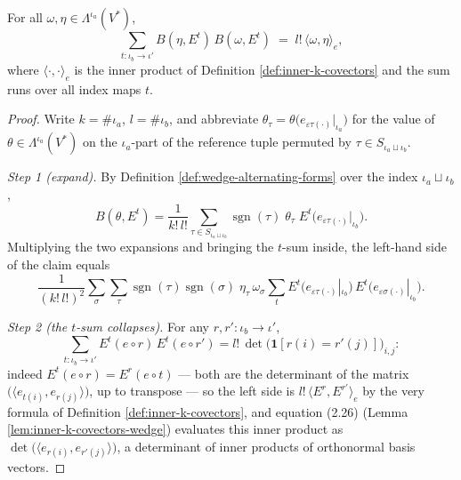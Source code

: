 \begin{lemma}
\label{lem:hodge-scalar-identity}
\leanok
{}
For all $\omega, \eta \in \Lambda^{\iota_a}(V^*)$,
\[
\sum_{t \colon \iota_b \to \iota'} B(\eta, E^t)\, B(\omega, E^t) \;=\; l!\, \langle \omega, \eta \rangle_e,
\]
where $\langle \cdot, \cdot \rangle_e$ is the inner product of Definition \ref{def:inner-k-covectors} and the sum runs over all index maps $t$.
\end{lemma}
\begin{proof}
\leanok
Write $k = \#\iota_a$, $l = \#\iota_b$, and abbreviate $\theta_\tau = \theta\big(e_{\varepsilon\tau(\cdot)}|_{\iota_a}\big)$ for the value of $\theta \in \Lambda^{\iota_a}(V^*)$ on the $\iota_a$-part of the reference tuple permuted by $\tau \in S_{\iota_a \sqcup \iota_b}$.

\emph{Step 1 (expand).} By Definition \ref{def:wedge-alternating-forms} over the index $\iota_a \sqcup \iota_b$,
\[
B(\theta, E^t) = \frac{1}{k!\,l!} \sum_{\tau \in S_{\iota_a \sqcup \iota_b}} \operatorname{sgn}(\tau)\; \theta_\tau \; E^t\big(e_{\varepsilon\tau(\cdot)}|_{\iota_b}\big).
\]
Multiplying the two expansions and bringing the $t$-sum inside, the left-hand side of the claim equals
\[
\frac{1}{(k!\,l!)^2} \sum_{\sigma} \sum_{\tau} \operatorname{sgn}(\tau)\operatorname{sgn}(\sigma)\; \eta_\tau\, \omega_\sigma \sum_{t} E^t\big(e_{\varepsilon\tau(\cdot)}|_{\iota_b}\big)\, E^t\big(e_{\varepsilon\sigma(\cdot)}|_{\iota_b}\big).
\]

\emph{Step 2 (the $t$-sum collapses).} For any $r, r' \colon \iota_b \to \iota'$,
\[
\sum_{t \colon \iota_b \to \iota'} E^t(e \circ r)\, E^t(e \circ r') = l!\, \det\big(\mathbf{1}[r(i) = r'(j)]\big)_{i,j}:
\]
indeed $E^t(e \circ r) = E^r(e \circ t)$ --- both are the determinant of the matrix $\big(\langle e_{t(i)}, e_{r(j)}\rangle\big)$, up to transpose --- so the left side is $l!\,\langle E^r, E^{r'}\rangle_e$ by the very formula of Definition \ref{def:inner-k-covectors}, and equation (2.26) (Lemma \ref{lem:inner-k-covectors-wedge}) evaluates this inner product as $\det\big(\langle e_{r(i)}, e_{r'(j)}\rangle\big)$, a determinant of inner products of orthonormal basis vectors.


\end{proof}
